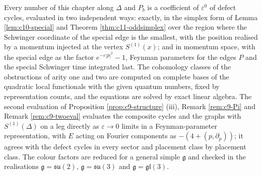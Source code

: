 \begin{remark}
\label{rem:c9-methodD}
Every number of this chapter along $\Delta$ and $P_b$ is a coefficient of $\varepsilon^0$ of defect cycles, evaluated in two independent ways: exactly, in the simplex form of Lemma \ref{lem:c10-special} and Theorem \ref{thm:c11-oddsimplex} over the region where the Schwinger coordinate of the special edge is the smallest, with the position realised by a momentum injected at the vertex $S^{(1)}(x)$; and in momentum space, with the special edge as the factor $e^{-\varepsilon|p|^2}-1$, Feynman parameters for the edges $P$ and the special Schwinger time integrated last. The cohomology classes of the obstructions of arity one and two are computed on complete bases of the quadratic local functionals with the given quantum numbers, fixed by representation counts, and the equations are solved by exact linear algebra. The second evaluation of Proposition \ref{prop:c9-structure} (iii), Remark \ref{rem:c9-Pi} and Remark \ref{rem:c9-twoeval} evaluates the composite cycles and the graphs with $S^{(1)}(\Delta)$ on a leg directly as $\varepsilon\to0$ limits in a Feynman-parameter representation, with $E$ acting on Fourier components as $-(4+(p,\partial_p))$; it agrees with the defect cycles in every sector and placement class by placement class. The colour factors are reduced for a general simple $\mathfrak g$ and checked in the realisations $\mathfrak g=\mathfrak{su}(2)$, $\mathfrak g=\mathfrak{su}(3)$ and $\mathfrak g=\mathfrak{gl}(3)$.
\end{remark}

